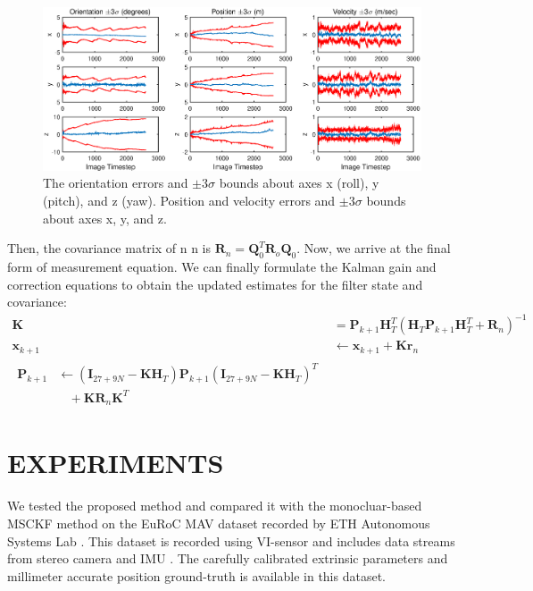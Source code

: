 \documentclass[a4paper, 10pt, conference]{ieeeconf}      %
\begin{document}
\begin{figure}[htbp] %
	\centering
	\includegraphics[width=1\linewidth]{3covarince.eps} %
	\caption{The orientation errors and  $ \pm 3 \sigma $ bounds  about axes x (roll), y (pitch), and z (yaw).  Position and velocity errors and  $ \pm 3 \sigma $ bounds  about axes x, y, and z.  }
	\label{fig2}
\end{figure}

Then, the covariance matrix of n
n is $ \bm R_n = \bm Q_0^T \bm R_o \bm Q_0 $.
Now, we arrive at  the final form of measurement equation. We can finally  formulate the Kalman gain and correction
equations to obtain the updated estimates for the filter state and covariance:
\begin{align}
\bm K &= \bm P_{k+1}\bm H_T^T																		(\bm H_T \bm P_{k+1} \bm H_T^T + \bm R_n )^{-1} \\
 \bm {x}_{k+1} &  \leftarrow  \bm {x}_{k+1} + \bm K \bm r_n \\
  \begin{split}
  \bm P_{k+1} &  \leftarrow (\bm I_{27+9N}-\bm K \bm H_T) \bm
  P_{k+1}(\bm I_{27+9N}-\bm K \bm H_T)^T \\
 & \ \ \ \ +\bm K \bm R_n \bm K^T
  \end{split}
\end{align}


	
\section{EXPERIMENTS}

We tested the proposed method and compared it with the monocluar-based MSCKF method on the  EuRoC MAV dataset recorded by ETH Autonomous Systems Lab . This dataset is recorded using VI-sensor and includes data streams from stereo camera and IMU . The carefully calibrated extrinsic parameters and millimeter accurate position ground-truth is available in this dataset.
 
\end{document}
